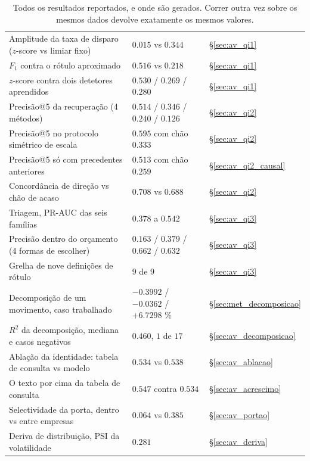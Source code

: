 \begin{table}[H]
\caption[Cada resultado e o procedimento que o produz]{Todos os resultados reportados, e onde são
gerados. Correr outra vez sobre os mesmos dados devolve exatamente os mesmos valores.}
\label{tab:ap_numeros}
\centering
\small
\begin{tabular}{p{} L{0.20\textwidth} L{0.22\textwidth}}
\toprule
{} &  &  \\
\midrule
Amplitude da taxa de disparo ($z$-score vs limiar fixo) & $0.015$ vs $0.344$ & §\ref{sec:av_qi1} \\
$F_1$ contra o rótulo aproximado & $0.516$ vs $0.218$ & §\ref{sec:av_qi1} \\
$z$-score contra dois detetores aprendidos & $0.530$ / $0.269$ / $0.280$ & §\ref{sec:av_qi1} \\
Precisão@5 da recuperação (4 métodos) & $0.514$ / $0.346$ / $0.240$ / $0.126$ & §\ref{sec:av_qi2} \\
Precisão@5 no protocolo simétrico de escala & $0.595$ com chão $0.333$ & §\ref{sec:av_qi2} \\
Precisão@5 só com precedentes anteriores & $0.513$ com chão $0.259$ &
§\ref{sec:av_qi2_causal} \\
Concordância de direção vs chão de acaso & $0.708$ vs $0.688$ & §\ref{sec:av_qi2} \\
Triagem, PR-AUC das seis famílias & $0.378$ a $0.542$ & §\ref{sec:av_qi3} \\
Precisão dentro do orçamento (4 formas de escolher) & $0.163$ / $0.379$ / $0.662$ / $0.632$ &
§\ref{sec:av_qi3} \\
Grelha de nove definições de rótulo & $9$ de $9$ & §\ref{sec:av_qi3} \\
Decomposição de um movimento, caso trabalhado & $-0.3992$ / $-0.0362$ / $+6.7298$ \% &
§\ref{sec:met_decomposicao} \\
$R^2$ da decomposição, mediana e casos negativos & $0.460$, $1$ de $17$ &
§\ref{sec:av_decomposicao} \\
Ablação da identidade: tabela de consulta vs modelo & $0.534$ vs $0.538$ &
§\ref{sec:av_ablacao} \\
O texto por cima da tabela de consulta & $0.547$ contra $0.534$ &
§\ref{sec:av_acrescimo} \\
Selectividade da porta, dentro vs entre empresas & $0.064$ vs $0.385$ & §\ref{sec:av_portao} \\
Deriva de distribuição, \gls{PSI} da volatilidade & $0.281$ & §\ref{sec:av_deriva} \\

\end{tabular}
\end{table}
